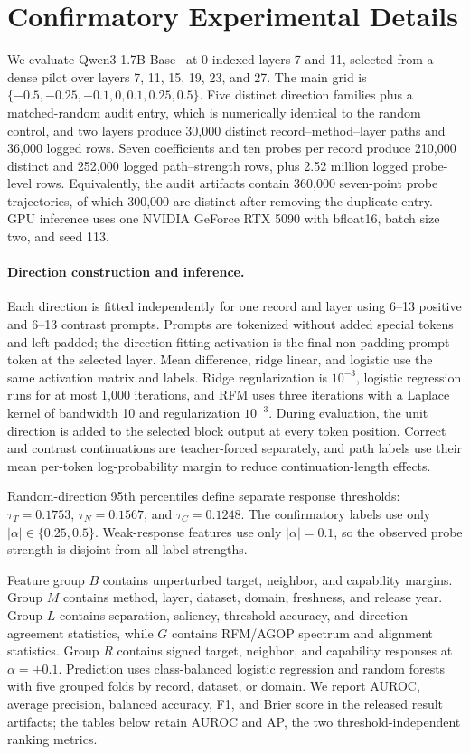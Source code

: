 \section{Confirmatory Experimental Details}

We evaluate Qwen3-1.7B-Base~\cite{yang2025qwen3} at 0-indexed layers 7 and 11, selected from a dense
pilot over layers 7, 11, 15, 19, 23, and 27. The main grid is
$\{-0.5,-0.25,-0.1,0,0.1,0.25,0.5\}$. Five distinct direction families plus
a matched-random audit entry, which is numerically identical to the random
control, and two layers produce 30,000 distinct record--method--layer paths and
36,000 logged rows. Seven coefficients and ten probes per record produce
210,000 distinct and 252,000 logged path--strength rows, plus 2.52 million
logged probe-level rows. Equivalently, the audit artifacts contain 360,000
seven-point probe trajectories, of which 300,000 are distinct after removing
the duplicate entry.
GPU inference uses one NVIDIA GeForce RTX 5090 with bfloat16, batch size two,
and seed 113.

\paragraph{Direction construction and inference.}
Each direction is fitted independently for one record and layer using 6--13
positive and 6--13 contrast prompts. Prompts are tokenized without added
special tokens and left padded; the direction-fitting activation is the final
non-padding prompt token at the selected layer. Mean difference, ridge linear,
and logistic use the same activation matrix and labels. Ridge regularization is
$10^{-3}$, logistic regression runs for at most 1,000 iterations, and RFM uses
three iterations with a Laplace kernel of bandwidth 10 and regularization
$10^{-3}$. During evaluation, the unit direction is added to the selected
block output at every token position. Correct and contrast continuations are
teacher-forced separately, and path labels use their mean per-token log-probability
margin to reduce continuation-length effects.

Random-direction 95th percentiles define separate response thresholds:
$\tau_T=0.1753$, $\tau_N=0.1567$, and $\tau_C=0.1248$. The confirmatory labels
use only $|\alpha|\in\{0.25,0.5\}$. Weak-response features use only
$|\alpha|=0.1$, so the observed probe strength is disjoint from all label
strengths.

Feature group $B$ contains unperturbed target, neighbor, and capability margins.
Group $M$ contains method, layer, dataset, domain, freshness, and release year.
Group $L$ contains separation, saliency, threshold-accuracy, and
direction-agreement statistics, while $G$ contains RFM/AGOP spectrum and
alignment statistics. Group $R$ contains signed target, neighbor, and
capability responses at $\alpha=\pm0.1$.
Prediction uses class-balanced logistic regression and random forests with five
grouped folds by record, dataset, or domain. We report AUROC, average precision,
balanced accuracy, F1, and Brier score in the released result artifacts; the
tables below retain AUROC and AP, the two threshold-independent ranking metrics.

